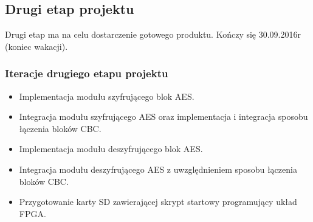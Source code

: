 \subsection{Drugi etap projektu}
Drugi etap ma na celu dostarczenie gotowego produktu. Kończy się 30.09.2016r (koniec wakacji).
\subsubsection{Iteracje drugiego etapu projektu}
\begin{itemize}
\item Implementacja modułu szyfrującego blok AES.
\item Integracja modułu szyfrującego AES oraz implementacja i integracja sposobu łączenia bloków CBC.
\item Implementacja modułu deszyfrującego blok AES.
\item Integracja modułu deszyfrującego AES z uwzględnieniem sposobu łączenia bloków CBC.
\item Przygotowanie karty SD zawierającej skrypt startowy programujący układ FPGA.
\end{itemize}


\newpage